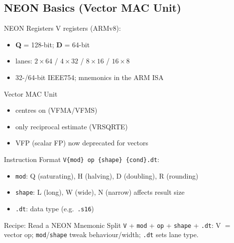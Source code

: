\subsection{NEON Basics (Vector MAC Unit)}


\begin{definition}{NEON Registers}
    V registers (ARMv8):
    \begin{itemize}
        \item \textbf{Q} = 128-bit; \textbf{D} = 64-bit
        \item lanes: $2{\times}64$ / $4{\times}32$ / $8{\times}16$ / $16{\times}8$
        \item 32-/64-bit IEEE754; mnemonics in the ARM ISA
    \end{itemize}
\end{definition}

\begin{concept}{Vector MAC Unit}
    \begin{itemize}
        \item centres on  (VFMA/VFMS)
        \item {} only reciprocal estimate (VRSQRTE)
        \item VFP (scalar FP) now deprecated for vectors
    \end{itemize}
\end{concept}

\multend

\begin{definition}{Instruction Format}
    \texttt{V\{mod\}\,op\,\{shape\}\,\{cond\}.dt}:
    \begin{itemize}
        \item \texttt{mod}: Q (saturating), H (halving), D (doubling), R (rounding)
        \item \texttt{shape}: L (long), W (wide), N (narrow) affects result size
        \item \texttt{.dt}: data type (e.g.\ \texttt{.s16})
    \end{itemize}
\end{definition}

\begin{KR}{Recipe: Read a NEON Mnemonic}
    Split \texttt{V} + \texttt{mod} + \texttt{op} + \texttt{shape} + \texttt{.dt}: V $=$ vector op; \texttt{mod}/\texttt{shape} tweak behaviour/width; \texttt{.dt} sets lane type.
\end{KR}

